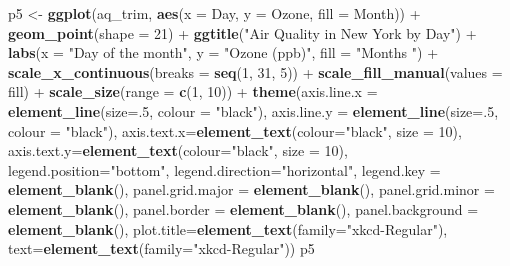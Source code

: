\documentclass[]{article}
\newenvironment{Shaded}{\begin{snugshade}}{\end{snugshade}}
\newcommand{\KeywordTok}[1]{\textcolor[rgb]{0.13,0.29,0.53}{\textbf{{#1}}}}
\newcommand{\DataTypeTok}[1]{\textcolor[rgb]{0.13,0.29,0.53}{{#1}}}
\newcommand{\DecValTok}[1]{\textcolor[rgb]{0.00,0.00,0.81}{{#1}}}
\newcommand{\StringTok}[1]{\textcolor[rgb]{0.31,0.60,0.02}{{#1}}}
\newcommand{\NormalTok}[1]{{#1}}
\begin{document}
\begin{Shaded}
\begin{Highlighting}[]
\NormalTok{p5 <-}\StringTok{ }\KeywordTok{ggplot}\NormalTok{(aq_trim, }\KeywordTok{aes}\NormalTok{(}\DataTypeTok{x =} \NormalTok{Day, }\DataTypeTok{y =} \NormalTok{Ozone, }\DataTypeTok{fill =} \NormalTok{Month)) +}\StringTok{ }
\StringTok{  }\KeywordTok{geom_point}\NormalTok{(}\DataTypeTok{shape =} \DecValTok{21}\NormalTok{) +}
\StringTok{  }\KeywordTok{ggtitle}\NormalTok{(}\StringTok{"Air Quality in New York by Day"}\NormalTok{) +}\StringTok{ }
\StringTok{  }\KeywordTok{labs}\NormalTok{(}\DataTypeTok{x =} \StringTok{"Day of the month"}\NormalTok{, }\DataTypeTok{y =} \StringTok{"Ozone (ppb)"}\NormalTok{, }\DataTypeTok{fill =} \StringTok{"Months "}\NormalTok{) +}
\StringTok{  }\KeywordTok{scale_x_continuous}\NormalTok{(}\DataTypeTok{breaks =} \KeywordTok{seq}\NormalTok{(}\DecValTok{1}\NormalTok{, }\DecValTok{31}\NormalTok{, }\DecValTok{5}\NormalTok{)) +}
\StringTok{  }\KeywordTok{scale_fill_manual}\NormalTok{(}\DataTypeTok{values =} \NormalTok{fill) +}
\StringTok{  }\KeywordTok{scale_size}\NormalTok{(}\DataTypeTok{range =} \KeywordTok{c}\NormalTok{(}\DecValTok{1}\NormalTok{, }\DecValTok{10}\NormalTok{)) +}
\StringTok{  }\KeywordTok{theme}\NormalTok{(}\DataTypeTok{axis.line.x =} \KeywordTok{element_line}\NormalTok{(}\DataTypeTok{size=}\NormalTok{.}\DecValTok{5}\NormalTok{, }\DataTypeTok{colour =} \StringTok{"black"}\NormalTok{), }
    \DataTypeTok{axis.line.y =} \KeywordTok{element_line}\NormalTok{(}\DataTypeTok{size=}\NormalTok{.}\DecValTok{5}\NormalTok{, }\DataTypeTok{colour =} \StringTok{"black"}\NormalTok{),}
    \DataTypeTok{axis.text.x=}\KeywordTok{element_text}\NormalTok{(}\DataTypeTok{colour=}\StringTok{"black"}\NormalTok{, }\DataTypeTok{size =} \DecValTok{10}\NormalTok{), }
    \DataTypeTok{axis.text.y=}\KeywordTok{element_text}\NormalTok{(}\DataTypeTok{colour=}\StringTok{"black"}\NormalTok{, }\DataTypeTok{size =} \DecValTok{10}\NormalTok{), }
    \DataTypeTok{legend.position=}\StringTok{"bottom"}\NormalTok{, }
    \DataTypeTok{legend.direction=}\StringTok{"horizontal"}\NormalTok{,}
    \DataTypeTok{legend.key =} \KeywordTok{element_blank}\NormalTok{(),}
    \DataTypeTok{panel.grid.major =} \KeywordTok{element_blank}\NormalTok{(),}
    \DataTypeTok{panel.grid.minor =} \KeywordTok{element_blank}\NormalTok{(), }
    \DataTypeTok{panel.border =} \KeywordTok{element_blank}\NormalTok{(),}
    \DataTypeTok{panel.background =} \KeywordTok{element_blank}\NormalTok{(),}
    \DataTypeTok{plot.title=}\KeywordTok{element_text}\NormalTok{(}\DataTypeTok{family=}\StringTok{"xkcd-Regular"}\NormalTok{), }
    \DataTypeTok{text=}\KeywordTok{element_text}\NormalTok{(}\DataTypeTok{family=}\StringTok{"xkcd-Regular"}\NormalTok{)) }
\NormalTok{p5}
\end{Highlighting}
\end{Shaded}
\end{document}
